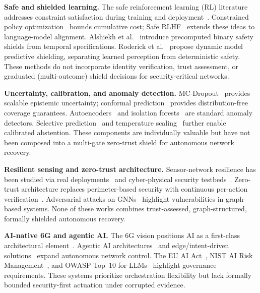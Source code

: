\documentclass[lettersize,journal]{IEEEtran}
\begin{document}
\noindent\textbf{Safe and shielded learning.}
The safe reinforcement learning (RL) literature addresses constraint satisfaction during training and deployment~\cite{garcia2015saferl,brunke2022safe}.
Constrained policy optimization~\cite{achiam2017cpo} bounds cumulative cost; Safe RLHF~\cite{dai2024saferlhf} extends these ideas to language-model alignment.
Alshiekh et al.~\cite{alshiekh2018shielding} introduce precomputed binary safety shields from temporal specifications.
Roderick et al.~\cite{roderick2024dmps} propose dynamic model predictive shielding, separating learned perception from deterministic safety.
These methods do not incorporate identity verification, trust assessment, or graduated (multi-outcome) shield decisions for security-critical networks.

\noindent\textbf{Uncertainty, calibration, and anomaly detection.}
MC-Dropout~\cite{gal2016dropout} provides scalable epistemic uncertainty; conformal prediction~\cite{angelopoulos2023conformal} provides distribution-free coverage guarantees.
Autoencoders~\cite{an2015variational,chalapathy2019deep} and isolation forests~\cite{zahoor2025ifocsvm,haque2023dbscanwsn} are standard anomaly detectors.
Selective prediction~\cite{geifman2017selective} and temperature scaling~\cite{guo2017calibration} further enable calibrated abstention.
These components are individually valuable but have not been composed into a multi-gate zero-trust shield for autonomous network recovery.

\noindent\textbf{Resilient sensing and zero-trust architecture.}
Sensor-network resilience has been studied via real deployments~\cite{sensorscope2008,intel_lab_data_2004} and cyber-physical security testbeds~\cite{goh2017swat,wadi2018,cardenas2011attacks}.
Zero-trust architecture replaces perimeter-based security with continuous per-action verification~\cite{rose2020nist,chen2024survey,stafford2020zerotrust}.
Adversarial attacks on GNNs~\cite{zugner2018adversarial,dai2018adversarial} highlight vulnerabilities in graph-based systems.
None of these works combines trust-assessed, graph-structured, formally shielded autonomous recovery.

\noindent\textbf{AI-native 6G and agentic AI.}
The 6G vision positions AI as a first-class architectural element~\cite{saad2020vision6g,letaief2019roadmap6g,polese2025ainative,zhang2025ainative6g,liu2025nativeai6g}.
Agentic AI architectures~\cite{toward_autonomous_oran_2026,demirel2026agentic,lee2024llmran} and edge/intent-driven solutions~\cite{demichelis2025edge,dasilva2024xapp,abousab2025ainativephy} expand autonomous network control.
The EU AI Act~\cite{euaiact2024}, NIST AI Risk Management~\cite{nist2023airisk}, and OWASP Top~10 for LLMs~\cite{owasp2025llm} highlight governance requirements.
These systems prioritize orchestration flexibility but lack formally bounded security-first actuation under corrupted evidence.
\end{document}
